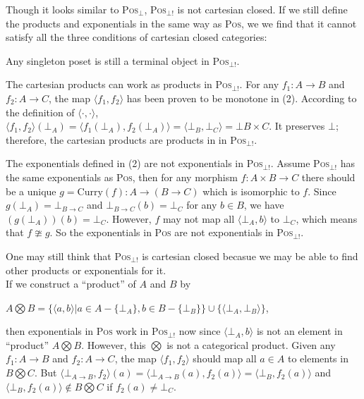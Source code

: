 \begin{myitemize}
Though it looks similar to \textsc{Pos}$_\bot$, \textsc{Pos}$_{\bot !}$ is not cartesian closed. If we still define the products and exponentials in the same way as \textsc{Pos}, we we find that it cannot satisfy all the three conditions of cartesian closed categories:
\begin{myitemize}
\item Any singleton poset is still a terminal object in \textsc{Pos}$_{\bot !}$.
\item The cartesian products can work as products in \textsc{Pos}$_{\bot !}$. For any $ f_1: A \to B $ and $ f_2: A \to C $, the map $ \langle f_1, f_2 \rangle $ has been proven to be monotone in (2). According to the definition of $ \langle \cdot, \cdot \rangle $, $ \langle f_1, f_2 \rangle (\bot_A) = \langle f_1(\bot_A), f_2(\bot_A) \rangle = \langle \bot_B, \bot_C \rangle = \bot{B \times C} $. It preserves $ \bot $; therefore, the cartesian products are products in in \textsc{Pos}$_{\bot !}$.
\item The exponentials defined in (2) are not exponentials in \textsc{Pos}$_{\bot !}$. Assume \textsc{Pos}$_{\bot !}$ has the same exponentials as \textsc{Pos}, then for any morphism $ f: A \times B \to C $ there should be a unique $ g = \text{Curry}(f): A \to (B \to C) $ which is isomorphic to $ f $. Since $ g(\bot _A)= \bot _{B \to C} $ and $ \bot _{B \to C} (b) = \bot _C $ for any $ b \in B $, we have $ (g(\bot _A))(b) = \bot _C $. However, $ f $ may not map all $ \langle \bot _A , b \rangle $ to $ \bot _C $, which means that $ f \ncong g $. So the exponentials in \textsc{Pos} are not exponentials in \textsc{Pos}$_{\bot !}$.
\end{myitemize}
One may still think that \textsc{Pos}$_{\bot !}$ is cartesian closed becasue we may be able to find other products or exponentials for it.\\
If we construct a ``product'' of $ A $ and $ B $ by
\begin{center}
$ A \bigotimes B = \{ \langle a,b \rangle | a \in A - \{ \bot_A \}, b \in B -\{ \bot_B \} \} \cup \{ \langle \bot_A, \bot_B \rangle \} $,
\end{center}
then exponentials in \textsc{Pos} work in \textsc{Pos}$_{\bot !}$ now since $ \langle \bot_A,b \rangle $ is not an element in ``product'' $ A \bigotimes B $. However, this $ \bigotimes $ is not a categorical product. Given any $ f_1: A \to B $ and $ f_2: A \to C $, the map $ \langle f_1, f_2 \rangle $ should map all $ a \in A $ to elements in $ B \bigotimes C $. But $ \langle \bot_{A \to B}, f_2 \rangle (a) = \langle \bot_{A \to B}(a), f_2(a) \rangle = \langle \bot_B, f_2(a) \rangle $ and $ \langle \bot_B, f_2(a) \rangle \not\in B \bigotimes C $ if $ f_2(a) \neq \bot_C $.\\

\end{myitemize}

